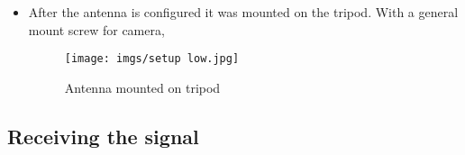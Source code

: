\documentclass{article}
\begin{document}
\begin{itemize}
                \item[] After the antenna is configured it was mounted on the tripod. With a general mount screw for camera,

                \begin{figure}[H]
                    \centering
                    \texttt{[image: imgs/setup low.jpg]}
                    \caption{Antenna mounted on tripod}
                    \label{img:mount}
                \end{figure}
                
        \end{itemize}
        
    \subsection{Receiving the signal}
\end{document}
